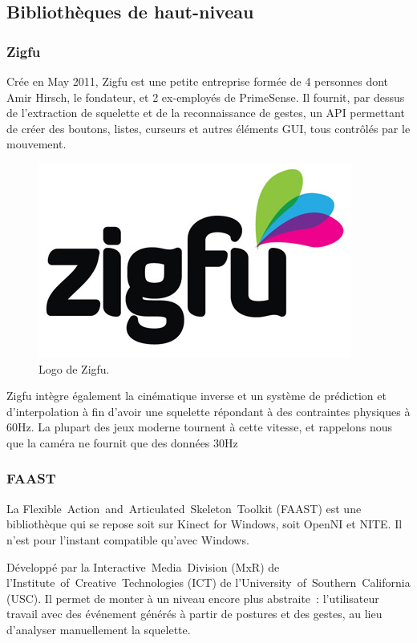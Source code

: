 \documentclass[french,12pt]{report}
\begin{document}
  
  \subsection{Bibliothèques de haut-niveau}
  
  \subsubsection{Zigfu}
  Crée en May 2011, Zigfu est une petite entreprise formée de 4 personnes dont 
  Amir Hirsch, le fondateur, et 2 ex-employés de PrimeSense. Il fournit, 
  par dessus de l'extraction de squelette et de la reconnaissance
  de gestes, un API permettant de créer des boutons, listes, curseurs et autres
  éléments GUI, tous contrôlés par le mouvement.
  \begin{figure}[h!]
  \centering
  \includegraphics[width=0.3\linewidth]{images/zigfu_logo}
  \caption{Logo de Zigfu.}
  \end{figure}
  Zigfu intègre également la cinématique inverse et un système de 
  prédiction et
  d'interpolation à fin d'avoir une squelette répondant à des contraintes 
  physiques à 60Hz. La plupart des jeux moderne tournent à cette vitesse, et 
  rappelons nous que la caméra ne fournit que des données 30Hz
  

  \subsubsection{FAAST}
  La Flexible~Action~and~Articulated~Skeleton~Toolkit (FAAST) est une 
  bibliothèque qui se repose soit sur Kinect for Windows, soit OpenNI et NITE.
  Il n'est pour l'instant compatible qu'avec Windows.
  
  Développé par la Interactive~Media~Division (MxR) de 
  l'Institute~of~Creative~Technologies (ICT) de 
  l'University~of~Southern~California (USC). Il permet de monter à un niveau 
  encore plus abstraite~: l'utilisateur travail avec des événement générés à
  partir de postures et des gestes, au lieu d'analyser manuellement la 
  squelette.
  
\end{document}
